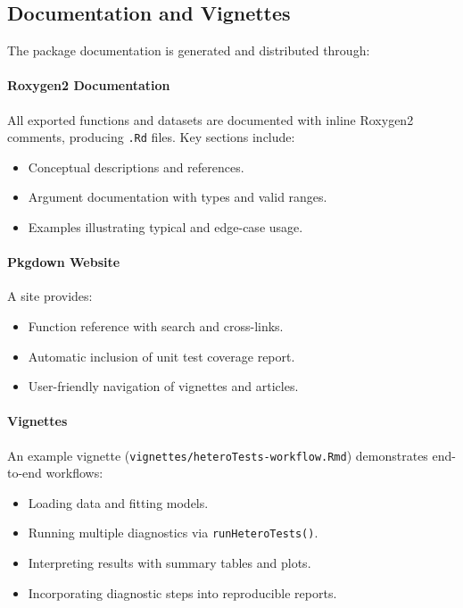 \subsection{Documentation and Vignettes}\label{sec:docs}
The  package documentation is generated and distributed through:

\paragraph{Roxygen2 Documentation}
All exported functions and datasets are documented with inline Roxygen2 comments, producing \texttt{.Rd} files. Key sections include:
\begin{itemize}
  \item Conceptual descriptions and references.
  \item Argument documentation with types and valid ranges.
  \item Examples illustrating typical and edge-case usage.
\end{itemize}

\paragraph{Pkgdown Website}
A  site provides:
\begin{itemize}
  \item Function reference with search and cross-links.
  \item Automatic inclusion of unit test coverage report.
  \item User-friendly navigation of vignettes and articles.
\end{itemize}

\paragraph{Vignettes}
An example vignette (\texttt{vignettes/heteroTests-workflow.Rmd}) demonstrates end-to-end workflows:
\begin{itemize}
  \item Loading data and fitting models.
  \item Running multiple diagnostics via \texttt{runHeteroTests()}.  
  \item Interpreting results with summary tables and plots.
  \item Incorporating diagnostic steps into reproducible reports.
\end{itemize}

